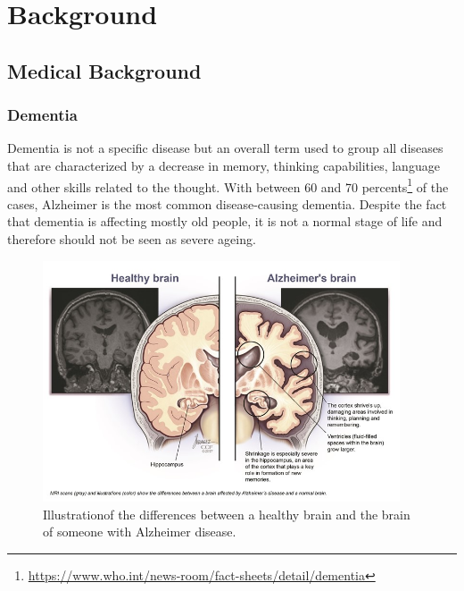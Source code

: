 \chapter{Background}
\label{chap:background}

\section{Medical Background}
\label{sec:medical_background}

\subsection{Dementia}
Dementia is not a specific disease but an overall term used to group all diseases that are characterized by a decrease in memory, thinking capabilities, language and other skills related to the thought. With between 60 and 70 percents\footnote{\href{https://www.who.int/news-room/fact-sheets/detail/dementia}{https://www.who.int/news-room/fact-sheets/detail/dementia}} of the cases, Alzheimer is the most common disease-causing dementia. Despite the fact that dementia is affecting mostly old people, it is not a normal stage of life and therefore should not be seen as severe ageing.

\begin{figure}
 \centering
 \includegraphics[width=400]{figures/Alzheimer_brain.jpg}
 \caption[Test]{Illustration\footnotemark of the differences between a healthy brain and the brain of someone with Alzheimer disease.}
 \label{fig:alzheimerbrain}
\end{figure}

